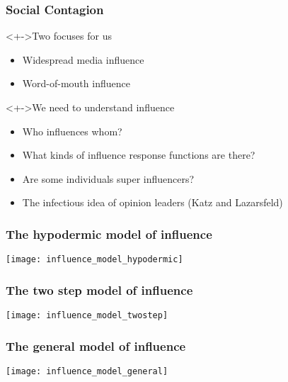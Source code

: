 \begin{frame}
  \frametitle{Social Contagion}

  \begin{block}<+->{Two focuses for us}
    \begin{itemize}
    \item<+-> Widespread media influence
    \item<+-> Word-of-mouth influence
    \end{itemize}
  \end{block}

  \begin{block}<+->{We need to understand influence}
    \begin{itemize}
    \item<+-> Who influences whom?  
    \item<+-> What kinds of influence response functions are there?
    \item<+-> Are some individuals super influencers?\\
    \item<+-> The infectious idea of opinion leaders (Katz and Lazarsfeld)\cite{katz1955a}
    \end{itemize}
  \end{block}
\end{frame}

\begin{frame}
  \frametitle{The hypodermic model of influence}

  \begin{center}
    \texttt{[image: influence\_model\_hypodermic]}    
  \end{center}


\end{frame}

\begin{frame}
  \frametitle{The two step model of influence\cite{katz1955a}}

  \begin{center}
    \texttt{[image: influence\_model\_twostep]}    
  \end{center}

\end{frame}

\begin{frame}
  \frametitle{The general model of influence}

  \begin{center}
    \texttt{[image: influence\_model\_general]}    
  \end{center}


\end{frame}


